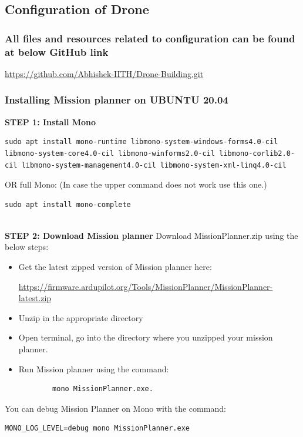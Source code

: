 \subsection{Configuration of Drone}
\subsubsection{All files and resources related to configuration can be found at below GitHub link} 
\begin{tcolorbox}
        \url{https://github.com/Abhishek-IITH/Drone-Building.git}
\end{tcolorbox}
\subsubsection{Installing Mission planner on UBUNTU 20.04}
\textbf{STEP 1: Install Mono}
\begin{lstlisting}
sudo apt install mono-runtime libmono-system-windows-forms4.0-cil libmono-system-core4.0-cil libmono-winforms2.0-cil libmono-corlib2.0-cil libmono-system-management4.0-cil libmono-system-xml-linq4.0-cil
\end{lstlisting}
OR full Mono: (In case the upper command does not work use this one.)
\begin{lstlisting}
sudo apt install mono-complete
\end{lstlisting}
\\
\textbf{STEP 2: Download Mission planner}
Download MissionPlanner.zip using the below steps:
\begin{itemize}
    \item Get the latest zipped version of Mission planner here:
    \begin{tcolorbox}
        \url{https://firmware.ardupilot.org/Tools/MissionPlanner/MissionPlanner-latest.zip}
    \end{tcolorbox}
    \item Unzip in the appropriate directory
    \item Open terminal, go into the directory where you unzipped your mission planner.
    \item Run Mission planner using the command:
    \begin{lstlisting}
        mono MissionPlanner.exe.
    \end{lstlisting}
\end{itemize}
You can debug Mission Planner on Mono with the command:
\begin{lstlisting}
MONO_LOG_LEVEL=debug mono MissionPlanner.exe
\end{lstlisting}

